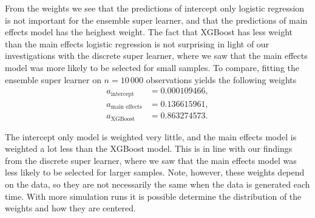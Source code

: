 \documentclass[./main.tex]{subfiles}
\begin{document}
From the weights we see that the predictions of intercept only logistic regression is not important for the ensemble super learner, and that the predictions of main effects model has the heighest weight. The fact that XGBoost has less weight than the main effects logistic regression is not surprising in light of our investigations with the discrete super learner, where we saw that the main effects model was more likely to be selected for small samples. To compare, fitting the ensemble super learner on $ n = 10\,000 $ observations yields the following weights
\begin{align*}
    a_{\text{intercept}} &= 0.000109466, \\
    a_{\text{main effects}} &= 0.136615961, \\
    a_{\text{XGBoost}} &= 0.863274573.
\end{align*}

The intercept only model is weighted very little, and the main effects model is weighted a lot less than the XGBoost model. This is in line with our findings from the discrete super learner, where we saw that the main effects model was less likely to be selected for larger samples. Note, however, these weights depend on the data, so they are not necessarily the same when the data is generated each time. With more simulation runs it is possible determine the distribution of the weights and how they are centered. 
\end{document}
